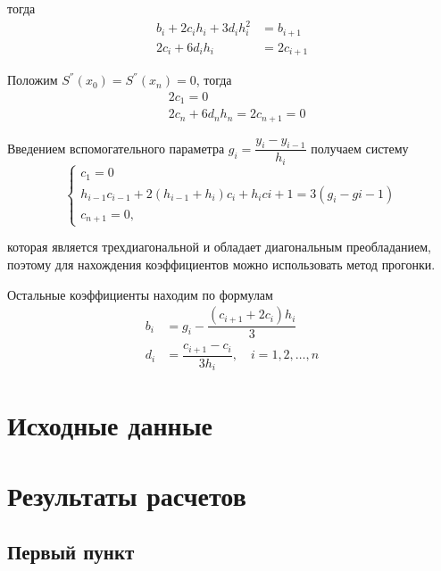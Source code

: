 \documentclass[12pt, a4paper]{article}
\begin{document}
\noindent тогда 
\[
    \begin{split}
        b_i + 2 c_i h_i + 3 d_i h_i^2 & = b_{i + 1} \\
        2 c_i + 6 d_i h_i & = 2 c_{i + 1}
    \end{split} 
\]

\pagebreak

Положим $ S^{''}(x_0) = S^{''}(x_n) = 0 $, тогда
\[
    \begin{split}
        &2 c_1 = 0 \\ 
        &2 c_n + 6 d_n h_n = 2 c_{n + 1} = 0
    \end{split}   
\]

Введением вспомогательного параметра $ g_i = \dfrac{y_i - y_{i-1}}{h_i} $ получаем систему
\[
  \begin{cases}
    c_1 = 0 \\
    h_{i - 1} c_{i - 1} + 2 (h_{i - 1} + h_i) c_i + h_i c{i + 1} = 3(g_i - g{i - 1}) \\
    c_{n + 1} = 0,
  \end{cases}  
\]

\noindent которая является трехдиагональной и обладает диагональным преобладанием, поэтому для нахождения коэффициентов можно использовать метод прогонки.

Остальные коэффициенты находим по формулам
\[
    \begin{split}
        b_i &= g_i  - \dfrac{(c_{i + 1} + 2 c_i) h_i}{3} \\ 
        d_i &= \dfrac{c_{i + 1} - c_i}{3 h_i}, \quad i = 1, 2, \ldots, n
    \end{split} 
\]


\section{Исходные данные}

\newpage

\section{Результаты расчетов}

\subsection{Первый пункт}
\end{document}
